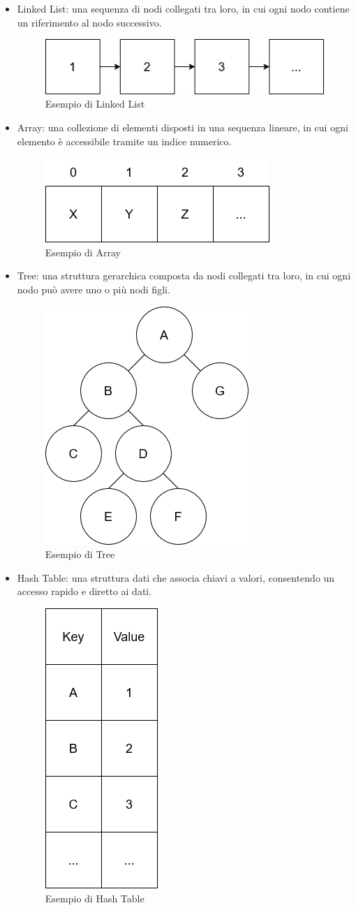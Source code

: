 \documentclass[12pt,a4paper,openright,twoside]{book}
\begin{document}
        \begin{itemize}
            \item Linked List: una sequenza di nodi collegati tra loro, in cui ogni nodo contiene un riferimento al nodo successivo.
            \begin{figure} [h]
                \centering
                \includegraphics[width=.4\linewidth]{figures/LinkedList.png}
                \caption{Esempio di Linked List}
                \label{fig:linked-list}
            \end{figure}
            \item Array: una collezione di elementi disposti in una sequenza lineare, in cui ogni elemento è accessibile tramite un indice numerico.
            \begin{figure} [h]
                \centering
                \includegraphics[width=.3\linewidth]{figures/Array.png}
                \caption{Esempio di Array}
                \label{fig:array}
            \end{figure}
            \item Tree: una struttura gerarchica composta da nodi collegati tra loro, in cui ogni nodo può avere uno o più nodi figli.
            \begin{figure} [h]
                \centering
                \includegraphics[width=.2\linewidth]{figures/Tree.png}
                \caption{Esempio di Tree}
                \label{fig:generic-tree}
            \end{figure}
            \item Hash Table: una struttura dati che associa chiavi a valori, consentendo un accesso rapido e diretto ai dati.
            \begin{figure} [h]
                \centering
                \includegraphics[width=.15\linewidth]{figures/HashTable.png}
                \caption{Esempio di Hash Table}
                \label{fig:hash-table}
            \end{figure}
        \end{itemize}
\end{document}

